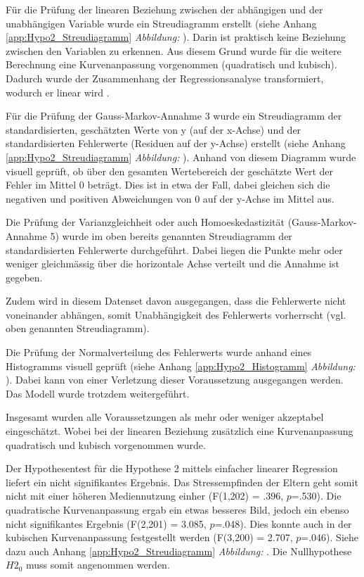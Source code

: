 Für die Prüfung der linearen Beziehung zwischen der abhängigen und der unabhängigen Variable wurde ein Streudiagramm erstellt (siehe Anhang \ref{app:Hypo2_Streudiagramm}  \textit{Abbildung: } ). Darin ist praktisch keine Beziehung zwischen den Variablen zu erkennen. Aus diesem Grund wurde für die weitere Berechnung eine Kurvenanpassung vorgenommen (quadratisch und kubisch). Dadurch wurde der Zusammenhang der Regressionsanalyse transformiert, wodurch er linear wird \cite{UniversitatZurich2018}.

Für die Prüfung der Gauss-Markov-Annahme 3 \cite{UniversitatZurich2018} wurde ein Streudiagramm der standardisierten, geschätzten Werte von y (auf der x-Achse) und der standardisierten Fehlerwerte (Residuen auf der y-Achse) erstellt (siehe Anhang \ref{app:Hypo2_Streudiagramm} \textit{Abbildung: }). Anhand von diesem Diagramm wurde visuell geprüft, ob über den gesamten Wertebereich der geschätzte Wert der Fehler im Mittel 0 beträgt. Dies ist in etwa der Fall, dabei gleichen sich die negativen und positiven Abweichungen von 0 auf der y-Achse im Mittel aus. 

Die Prüfung der Varianzgleichheit oder auch Homoeskedastizität (Gauss-Markov-Annahme 5) wurde im oben bereits genannten Streudiagramm der standardisierten Fehlerwerte durchgeführt. Dabei liegen die Punkte mehr oder weniger gleichmässig über die horizontale Achse verteilt \cite{Hemmerich2018} und die Annahme ist gegeben.

Zudem wird in diesem Datenset davon ausgegangen, dass die Fehlerwerte nicht voneinander abhängen, somit Unabhängigkeit des Fehlerwerts vorherrscht (vgl. oben genannten Streudiagramm).

Die Prüfung der Normalverteilung des Fehlerwerts wurde anhand eines Histogramms visuell geprüft (siehe Anhang \ref{app:Hypo2_Histogramm} \textit{Abbildung: }). Dabei kann von einer Verletzung dieser Voraussetzung ausgegangen werden. Das Modell wurde trotzdem weitergeführt.

Insgesamt wurden alle Voraussetzungen als mehr oder weniger akzeptabel eingeschätzt. Wobei bei der linearen Beziehung zusätzlich eine Kurvenanpassung quadratisch und kubisch vorgenommen wurde.

Der Hypothesentest für die Hypothese 2 mittels einfacher linearer Regression liefert ein nicht signifikantes Ergebnis. Das Stressempfinden der Eltern geht somit nicht mit einer höheren Mediennutzung einher (F(1,202) = .396, $p$=.530). Die quadratische Kurvenanpassung ergab ein etwas besseres Bild, jedoch ein ebenso nicht signifikantes Ergebnis (F(2,201) = 3.085, $p$=.048). Dies konnte auch in der kubischen Kurvenanpassung festgestellt werden (F(3,200) = 2.707, $p$=.046). Siehe dazu auch Anhang \ref{app:Hypo2_Streudiagramm} \textit{Abbildung: }. Die Nullhypothese $H2_{0}$ muss somit angenommen werden.

